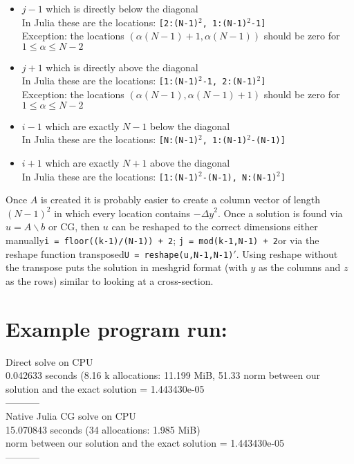 \documentclass[11pt]{article}
\begin{document}
	\begin{itemize}
		\item $ j-1 $ which is directly below the diagonal\\
		In Julia these are the locations: \texttt{[2:(N-1)$^2$, 1:(N-1)$^2$-1]}\\
		Exception: the locations $ (\alpha(N-1) + 1,\alpha(N-1)) $ should be zero for $ 1\leq\alpha\leq N-2 $ 
		\item $ j+1 $ which is directly above the diagonal\\
		In Julia these are the locations: \texttt{[1:(N-1)$^2$-1, 2:(N-1)$^2$]}\\
		Exception: the locations $ (\alpha(N-1),\alpha(N-1)+1) $ should be zero for $ 1\leq\alpha\leq N-2 $ 
		\item $ i-1 $ which are exactly $ N-1 $ below the diagonal\\
		In Julia these are the locations: \texttt{[N:(N-1)$^2$, 1:(N-1)$^2$-(N-1)]}
		\item $ i+1 $ which are exactly $ N+1 $ above the diagonal\\
		In Julia these are the locations: \texttt{[1:(N-1)$^2$-(N-1), N:(N-1)$^2$]}
	\end{itemize}
	Once $ A $ is created it is probably easier to create a column vector of length $ (N-1)^2 $ in which every location contains $ -{\Delta y}^2 $. Once a solution is found via $ u = A\backslash b $ or CG, then $ u $ can be reshaped to the correct dimensions either manually\textemdash \texttt{i = floor((k-1)/(N-1)) + 2}; \texttt{j = mod(k-1,N-1) + 2}\textemdash or via the reshape function transposed\textemdash \texttt{U = reshape(u,N-1,N-1)$'$}. Using reshape without the transpose puts the solution in meshgrid format (with $ y $ as the columns and $ z $ as the rows) similar to looking at a cross-section.\\
	
	\section{Example program run:}
	Direct solve on CPU\\
  0.042633 seconds (8.16 k allocations: 11.199 MiB, 51.33%
norm between our solution and the exact solution =  1.443430e-05 
\\-----------\\

Native Julia CG solve on CPU\\
 15.070843 seconds (34 allocations: 1.985 MiB)\\
norm between our solution and the exact solution =  1.443430e-05 
\\-----------\\
\end{document}
